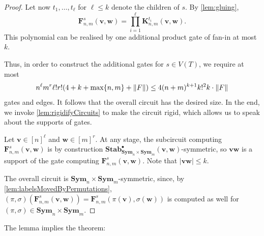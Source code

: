 \documentclass[10pt,a4paper]{article}
\theoremstyle{definition}
\theoremstyle{plain}
\theoremstyle{remark}
\DeclarePairedDelimiter{\norm}{\lVert}{\rVert}
\newcommand{\Sym}{\mathbf{Sym}}
\newcommand{\Stab}{\mathbf{Stab}}
\newcommand{\StabP}{\Stab^{\bullet}}
\begin{document}
\begin{proof}
 		Let now $t_1, \dots, t_\ell$ for $\ell \leq k$ denote the children of $s$.
 		By \cref{lem:gluing},
 		\begin{equation}\label{eq:circuit3}
 			\boldsymbol{F}^s_{n,m}(\boldsymbol{v},\boldsymbol{w}) = \prod_{i=1}^\ell \boldsymbol{K}^{t_i}_{n,m}(\boldsymbol{v}, \boldsymbol{w}).
 		\end{equation}
 		This polynomial can be realised by one additional product gate of fan-in at most $k$.
 		
 		Thus, in order to construct the additional gates for $s \in V(T)$, 
 		we require at most \[ n^\ell m^r \ell! r! (4 + k  + \max\{n,m\} + \norm{F})  \leq 4(n+m)^{k+1} k!^2 k \cdot \norm{F} \] gates and edges.
 		It follows that the overall circuit has the desired size. In the end, we invoke \cref{lem:rigidifyCircuits} to make the circuit rigid, which allows us to speak about the supports of gates.
 		
 		Let $\boldsymbol{v} \in [n]^\ell$ and $\boldsymbol{w} \in [m]^r$.
 		At any stage, the subcircuit computing $\boldsymbol{F}^s_{n,m}(\boldsymbol{v}, \boldsymbol{w})$ is by construction $\StabP_{\Sym_n \times \Sym_m}(\boldsymbol{v}, \boldsymbol{w})$-symmetric, so $\boldsymbol{v}\boldsymbol{w}$ is a support of the gate computing $\boldsymbol{F}^s_{n,m}(\boldsymbol{v}, \boldsymbol{w})$. Note that $|\boldsymbol{v}\boldsymbol{w}| \leq k$.
 		
 		The overall circuit is $\Sym_n \times \Sym_m$-symmetric,
 		since, by \cref{lem:labelsMovedByPermutations}, $(\pi, \sigma)(\boldsymbol{F}^s_{n,m}(\boldsymbol{v}, \boldsymbol{w})) = \boldsymbol{F}^s_{n,m}(\pi(\boldsymbol{v}), \sigma(\boldsymbol{w}))$ is computed as well for $(\pi, \sigma) \in \Sym_n \times \Sym_m$.
 	\end{proof}
 	
 	The lemma implies the theorem:
 	
\end{document}
